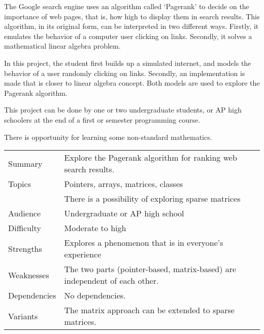 
The Google search engine uses an algorithm called `Pagerank'
to decide on the importance of web pages, that is,
how high to display them in search results.
This algorithm, in its original form, can be interpreted in two different ways.
Firstly, it emulates the behavior of a computer user clicking on links.
Secondly, it solves a mathematical linear algebra problem.

In this project, the student first builds up a simulated internet,
and models the behavior of a user randomly clicking on links.
Secondly, an implementation is made that is closer to linear
algebra concept. Both models are used to explore the Pagerank algorithm.

This project can be done by one or two undergraduate students,
or AP high schoolers
at the end of a first or semester programming course.

There is opportunity for learning some non-standard mathematics.

\newpage

\begin{tabular}{|l|p{5in}|}
  \hline
  Summary&Explore the Pagerank algorithm for ranking web search results.
  \\
  Topics&Pointers, arrays, matrices, classes\\
  &There is a possibility of exploring sparse matrices
  \\
  Audience&Undergraduate or AP high school
  \\
  Difficulty&Moderate to high
  \\
  Strengths&Explores a phenomenon that is in everyone's experience
  \\
  Weaknesses&The two parts (pointer-based, matrix-based) are independent
  of each other.
  \\
  Dependencies&No dependencies.
  \\
  Variants&The matrix approach can be extended to sparse matrices.
  \\
  \hline
\end{tabular}
